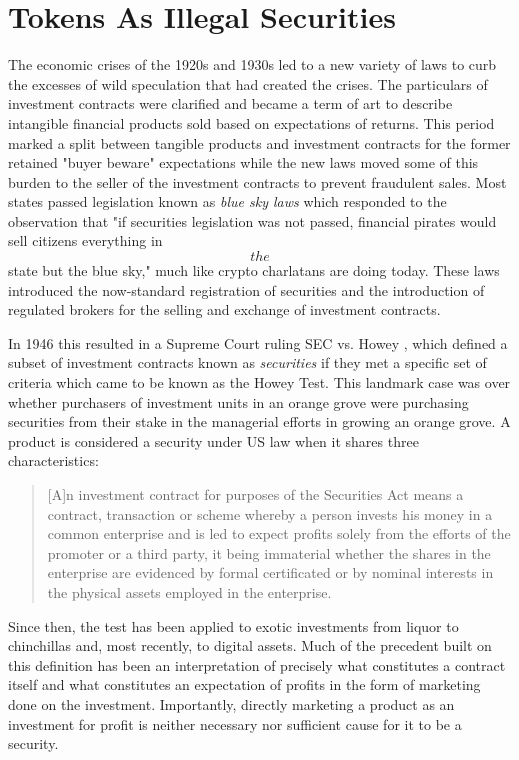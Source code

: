 \section{Tokens As Illegal Securities}


The economic crises of the 1920s and 1930s led to a new variety of laws to curb
the excesses of wild speculation that had created the crises. The particulars of
investment contracts were clarified and became a term of art to describe
intangible financial products sold based on expectations of returns. This period
marked a split between tangible products and investment contracts for the former
retained "buyer beware" expectations while the new laws moved some of this
burden to the seller of the investment contracts to prevent fraudulent sales.
Most states passed legislation known as \textit{blue sky laws} which responded to the
observation that "if securities legislation was not passed, financial pirates
would sell citizens everything in \[the\] state but the blue sky," much like
crypto charlatans are doing today. These laws introduced the now-standard
registration of securities and the introduction of regulated brokers for the
selling and exchange of investment contracts.


In 1946 this resulted in a Supreme Court ruling SEC vs. Howey
\cite{noauthor_sec_1946}, which defined a subset of investment contracts known
as \textit{securities} if they met a specific set of criteria which came to be
known as the Howey Test. This landmark case was over whether purchasers of
investment units in an orange grove were purchasing securities from their stake
in the managerial efforts in growing an orange grove. A product is considered a
security under US law when it shares three characteristics:

\begin{quote}
{[}A{]}n investment contract for purposes of the Securities Act means a
contract, transaction or scheme whereby a person invests his money in a
common enterprise and is led to expect profits solely from the efforts
of the promoter or a third party, it being immaterial whether the shares
in the enterprise are evidenced by formal certificated or by nominal
interests in the physical assets employed in the enterprise.
\end{quote}

Since then, the test has been applied to exotic investments from liquor
\cite{noauthor_continental_1967} to chinchillas \cite{noauthor_miller_1974} and,
most recently, to digital assets. Much of the precedent built on this definition
has been an interpretation of precisely what constitutes a contract itself and
what constitutes an expectation of profits in the form of marketing done on the
investment. Importantly, directly marketing a product as an investment for
profit is neither necessary nor sufficient cause for it to be a security.

